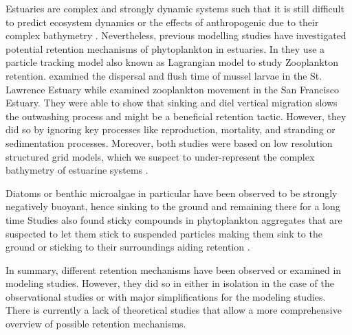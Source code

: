 \documentclass[npg, manuscript]{copernicus}
\begin{document}
Estuaries are complex and strongly dynamic systems such that it is still difficult to predict ecosystem dynamics or the effects of anthropogenic due to their complex bathymetry \citep{Michael2016, Fringer2019}. 
Nevertheless, previous modelling studies have investigated potential retention mechanisms of phytoplankton in estuaries.
In \citep{Simons2006,Kimmerer2014} they use a particle tracking model also known as Lagrangian model to study Zooplankton retention.
\citep{Simons2006} examined the dispersal and flush time of mussel larvae in the St. Lawrence Estuary while \citep{Kimmerer2014} examined zooplankton movement in the San Francisco Estuary.
They were able to show that sinking and diel vertical migration slows the outwashing process and might be a beneficial retention tactic.
However, they did so by ignoring key processes like reproduction, mortality, and stranding or sedimentation processes.
Moreover, both studies were based on low resolution structured grid models, which we suspect to under-represent the complex bathymetry of estuarine systems \citep{Ye2018}.

Diatoms or benthic microalgae in particular have been observed to be strongly negatively buoyant, hence sinking to the ground and remaining there for a long time \citep{Passow1991,ThomasAnderson1998}
Studies also found sticky compounds in phytoplankton aggregates that are suspected to let them stick to suspended particles making them sink to the ground or sticking to their surroundings aiding retention \citep{Kiørboe1993,VanderLee2000}.

In summary, different retention mechanisms have been observed or examined in modeling studies.
However, they did so in either in isolation in the case of the observational studies or with major simplifications for the modeling studies.
There is currently a lack of theoretical studies that allow a more comprehensive overview of possible retention mechanisms. 
\end{document}
